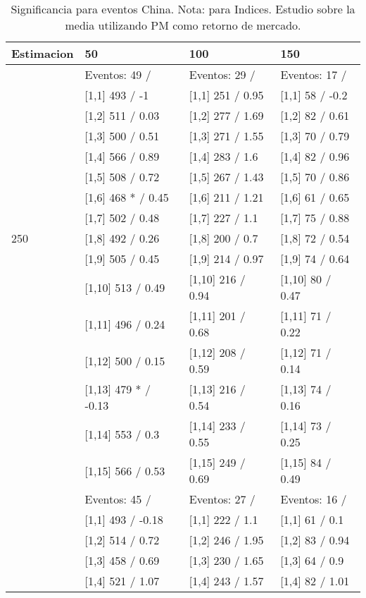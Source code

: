 \begin{table}

\caption{Significancia para eventos China. Nota: para Indices. Estudio sobre la media utilizando PM como retorno de mercado.}
\centering
\begin{tabular}[t]{llll}
\toprule
Estimacion & 50 & 100 & 150\\
\midrule
 & Eventos:  49 / & Eventos:  29 / & Eventos:  17 /\\
 & {}[1,1] 493  / -1 & {}[1,1] 251  / 0.95 & {}[1,1] 58  / -0.2\\
 & {}[1,2] 511  / 0.03 & {}[1,2] 277  / 1.69 & {}[1,2] 82  / 0.61\\
 & {}[1,3] 500  / 0.51 & {}[1,3] 271  / 1.55 & {}[1,3] 70  / 0.79\\
 & {}[1,4] 566  / 0.89 & {}[1,4] 283  / 1.6 & {}[1,4] 82  / 0.96\\
\addlinespace
 & {}[1,5] 508  / 0.72 & {}[1,5] 267  / 1.43 & {}[1,5] 70  / 0.86\\
 & {}[1,6] 468 * / 0.45 & {}[1,6] 211  / 1.21 & {}[1,6] 61  / 0.65\\
 & {}[1,7] 502  / 0.48 & {}[1,7] 227  / 1.1 & {}[1,7] 75  / 0.88\\
250 & {}[1,8] 492  / 0.26 & {}[1,8] 200  / 0.7 & {}[1,8] 72  / 0.54\\
 & {}[1,9] 505  / 0.45 & {}[1,9] 214  / 0.97 & {}[1,9] 74  / 0.64\\
\addlinespace
 & {}[1,10] 513  / 0.49 & {}[1,10] 216  / 0.94 & {}[1,10] 80  / 0.47\\
 & {}[1,11] 496  / 0.24 & {}[1,11] 201  / 0.68 & {}[1,11] 71  / 0.22\\
 & {}[1,12] 500  / 0.15 & {}[1,12] 208  / 0.59 & {}[1,12] 71  / 0.14\\
 & {}[1,13] 479 * / -0.13 & {}[1,13] 216  / 0.54 & {}[1,13] 74  / 0.16\\
 & {}[1,14] 553  / 0.3 & {}[1,14] 233  / 0.55 & {}[1,14] 73  / 0.25\\
\addlinespace
 & {}[1,15] 566  / 0.53 & {}[1,15] 249  / 0.69 & {}[1,15] 84  / 0.49\\
 & Eventos:  45 / & Eventos:  27 / & Eventos:  16 /\\
 & {}[1,1] 493  / -0.18 & {}[1,1] 222  / 1.1 & {}[1,1] 61  / 0.1\\
 & {}[1,2] 514  / 0.72 & {}[1,2] 246  / 1.95 & {}[1,2] 83  / 0.94\\
 & {}[1,3] 458  / 0.69 & {}[1,3] 230  / 1.65 & {}[1,3] 64  / 0.9\\
\addlinespace
 & {}[1,4] 521  / 1.07 & {}[1,4] 243  / 1.57 & {}[1,4] 82  / 1.01\\

\end{tabular}
\end{table}
